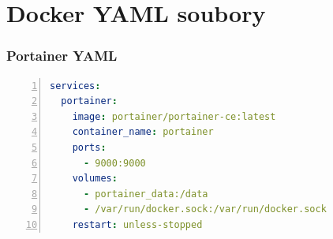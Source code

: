 \chapter{Docker YAML soubory}
\label{apend:dockeryaml}
\subsection{Portainer YAML}
\label{apend:portaineryaml}
\begin{lstlisting}[language=YAML, breaklines=true, numbers=left, numberstyle=\small, numbersep=10pt, frame=single, basicstyle=\ttfamily\small, caption={Portainer YAML}, label={lst:portaineryaml}]
services:
  portainer:
    image: portainer/portainer-ce:latest
    container_name: portainer
    ports:
      - 9000:9000
    volumes:
      - portainer_data:/data
      - /var/run/docker.sock:/var/run/docker.sock
    restart: unless-stopped
\end{lstlisting}
\pagebreak
